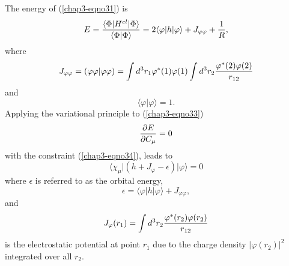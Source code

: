The energy of (\ref{chap3-eqno31}) is
\begin{equation}
E = {\langle \Phi \vert H^{el} \vert \Phi \rangle \over \langle 
\Phi \vert \Phi \rangle} = 2 \langle \varphi \vert h \vert \varphi 
\rangle + J_{\varphi \varphi} + {1 \over R} ,
\label{chap3-eqno33}
\end{equation}
where
\begin{equation}
J_{\varphi \varphi} = ( \varphi \varphi \vert \varphi \varphi ) = \int
d^3 r_1 \varphi^* (1) \varphi (1) \int d^3 r_2 {\varphi^* (2)
  \varphi(2) \over r_{12}}
\end{equation}
and
\begin{equation}
\langle \varphi \vert \varphi \rangle = 1 .
\label{chap3-eqno34}
\end{equation}
Applying the variational principle to (\ref{chap3-eqno33})
\begin{equation}
{\partial E \over \partial C_{\mu}} = 0
\end{equation}
with the constraint (\ref{chap3-eqno34}), leads to
\begin{equation}
\langle \chi_{\mu} \vert \left( h + J_{\varphi} - \epsilon \right) \vert 
\varphi \rangle = 0
\label{chap3-eqno35}
\end{equation}
where $\epsilon$ is referred to as the orbital energy,
\begin{equation}
\epsilon = \langle \varphi \vert h \vert \varphi \rangle + J_{\varphi \varphi} 
,
\label{chap3-eqno36}
\end{equation}
and
\begin{equation}
J_{\varphi} ( r_1 ) = \int d^3 r_2 {\varphi^* (r_2) \varphi (r_2) \over r_{12}}
\end{equation}
is the electrostatic potential at point $r_1$ due to the charge 
density $\vert \varphi ( r_2 ) \vert^2$ integrated over all $r_2$.

